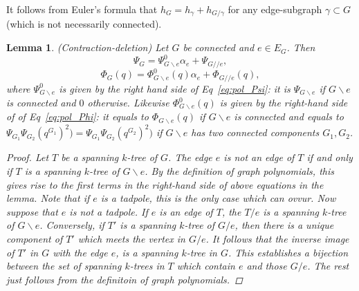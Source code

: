 \documentclass[11pt]{article}
\newtheorem{lemma}[thm]{Lemma}
\begin{document}
It follows from Euler's formula that
$h_G=h_\gamma+h_{G/\gamma}$
for any edge-subgraph $\gamma\subset G$ (which is not necessarily connected).
\begin{lemma}
(Contraction-deletion) Let $G$ be connected and $e\in E_G$. Then
$$
\Psi_G=\Psi_{G\backslash e}^0\alpha_e+\Psi_{G//e},
$$
$$
\Phi_G(q)=\Phi^0_{G\backslash e}(q)\alpha_e+\Phi_{G//e}(q),
$$
where $\Psi_{G\backslash e}^0$ is given by the right hand side of Eq~\ref{eq:pol_Psi}: it is $\Psi_{G\backslash e}$ if $G\backslash e$ is connected and $0$ otherwise. Likewise $\Phi_{G\backslash e}^0(q)$ is given by the right-hand side of of Eq~\ref{eq:pol_Phi}: it equals to $\Phi_{G\backslash e}(q)$ if $G\backslash e$ is connected and equals to $\Psi_{G_1}\Psi_{G_2}(q^{G_1})^2)=\Psi_{G_1}\Psi_{G_2}(q^{G_2})^2)$ if $G\backslash e$ has two connected components $G_1, G_2$.
\begin{proof}


Let $T$ be a spanning $k$-tree of $G$. The edge $e$ is not an edge of $T$ if and only if $T$ is a spanning $k$-tree of $G\backslash e$. By the definition of graph polynomials, this gives rise to the first terms in the right-hand side of above equations in the lemma. Note that if $e$ is a tadpole, this is the only case which can ovvur. Now suppose that $e$ is not a tadpole. If $e$ is an edge of $T$, the $T/e$ is a spanning $k$-tree of $G\backslash e$. Conversely, if $T'$ is a spanning $k$-tree of $G/e$, then there is a unique component of $T'$ which meets the vertex in $G/e$. It follows that the inverse image of $T'$ in $G$ with the edge $e$, is a spanning $k$-tree in $G$. This establishes a bijection between the set of spanning $k$-trees in $T$ which contain $e$ and those $G/e$. The rest just follows from the definitoin of graph polynomials.
\end{proof} 
\end{lemma}
\end{document}
